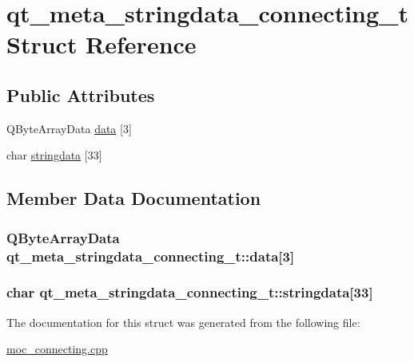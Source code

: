 \hypertarget{structqt__meta__stringdata__connecting__t}{\section{qt\-\_\-meta\-\_\-stringdata\-\_\-connecting\-\_\-t Struct Reference}
\label{structqt__meta__stringdata__connecting__t}
}
\subsection*{Public Attributes}
\begin{DoxyCompactItemize}
\item 
Q\-Byte\-Array\-Data \hyperlink{structqt__meta__stringdata__connecting__t_af242352d16488cda98d43dba57c95c04}{data} \mbox{[}3\mbox{]}
\item 
char \hyperlink{structqt__meta__stringdata__connecting__t_a34948417b01741f593a49b9d5fec37c8}{stringdata} \mbox{[}33\mbox{]}
\end{DoxyCompactItemize}


\subsection{Member Data Documentation}
\hypertarget{structqt__meta__stringdata__connecting__t_af242352d16488cda98d43dba57c95c04}{
\subsubsection[{data}]{\setlength{\rightskip}{0pt plus 5cm}Q\-Byte\-Array\-Data qt\-\_\-meta\-\_\-stringdata\-\_\-connecting\-\_\-t\-::data\mbox{[}3\mbox{]}}}\label{structqt__meta__stringdata__connecting__t_af242352d16488cda98d43dba57c95c04}
\hypertarget{structqt__meta__stringdata__connecting__t_a34948417b01741f593a49b9d5fec37c8}{
\subsubsection[{stringdata}]{\setlength{\rightskip}{0pt plus 5cm}char qt\-\_\-meta\-\_\-stringdata\-\_\-connecting\-\_\-t\-::stringdata\mbox{[}33\mbox{]}}}\label{structqt__meta__stringdata__connecting__t_a34948417b01741f593a49b9d5fec37c8}


The documentation for this struct was generated from the following file\-:\begin{DoxyCompactItemize}
\item 
\hyperlink{moc__connecting_8cpp}{moc\-\_\-connecting.\-cpp}\end{DoxyCompactItemize}
